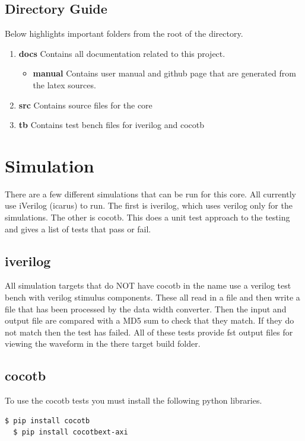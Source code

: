 

\subsection{Directory Guide}

\par
Below highlights important folders from the root of the directory.

\begin{enumerate}
  \item \textbf{docs} Contains all documentation related to this project.
    \begin{itemize}
      \item \textbf{manual} Contains user manual and github page that are generated from the latex sources.
    \end{itemize}
  \item \textbf{src} Contains source files for the core
  \item \textbf{tb} Contains test bench files for iverilog and cocotb
\end{enumerate}

\newpage

\section{Simulation}
\par
There are a few different simulations that can be run for this core. All currently use iVerilog (icarus) to run. The first is iverilog, which
uses verilog only for the simulations. The other is cocotb. This does a unit test approach to the testing and gives a list of tests that pass
or fail.

\subsection{iverilog}
\par
All simulation targets that do NOT have cocotb in the name use a verilog test bench with verilog stimulus components. These all read in a file
and then write a file that has been processed by the data width converter. Then the input and output file are compared with a MD5 sum to check that they
match. If they do not match then the test has failed. All of these tests provide fst output files for viewing the waveform in the there
target build folder.

\subsection{cocotb}
\par
To use the cocotb tests you must install the following python libraries.
\begin{lstlisting}[language=bash]
  $ pip install cocotb
  $ pip install cocotbext-axi
\end{lstlisting}

